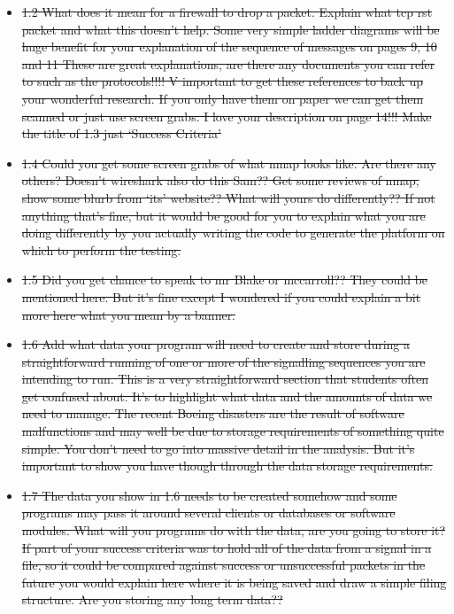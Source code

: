 \documentclass{article}
\begin{document}
\begin{itemize}
  \item{\sout{1.2 What does it mean for a firewall to drop a packet. Explain what tcp rst packet and what this doesn’t help.  Some very simple ladder diagrams will be huge benefit for your explanation of the sequence of messages on pages 9, 10 and 11 These are great explanations, are there any documents you can refer to such as the protocols!!!! V important to get these references to back up your wonderful research. If you only have them on paper we can get them scanned or just use screen grabs.  I love your description on page 14!!! Make the title of 1.3 just ‘Success Criteria’}}

  \item{\sout{1.4 Could you get some screen grabs of what nmap looks like. Are there any others? Doesn’t wireshark also do this Sam?? Get some reviews of nmap, show some blurb from ‘its’ website?? What will yours do differently?? If not anything that’s fine, but it would be good for you to explain what you are doing differently by you actually writing the code to generate the platform on which to perform the testing. }}

  \item{\sout{1.5 Did you get chance to speak to mr Blake or mccarroll?? They could be mentioned here. But it’s fine except I wondered if you could explain a bit more here what you mean by a banner. }}

  \item{\sout{1.6 Add what data your program will need to create and store during a straightforward running of one or more of the signalling sequences you are intending to run.   This is a very straightforward section that students often get confused about. It’s to highlight what data and the amounts of data we need to manage. The recent Boeing disasters are the result of  software malfunctions and may well be due to storage requirements of something quite simple. You don’t need to go into massive detail in the analysis. But it’s important to show you have though through the data storage requirements. }}

  \item{\sout{1.7 The data you show in 1.6 needs to be created somehow and some programs may pass it around several clients or databases or software modules.  What will you programs do with the data, are you going to store it? If part of your success criteria was to hold all of the data from a signal in a file, so it could be compared against success or unsuccessful packets in the future you would explain here where it is being saved and draw a simple filing structure. Are you storing any long term data??}}


\end{itemize}
\end{document}
